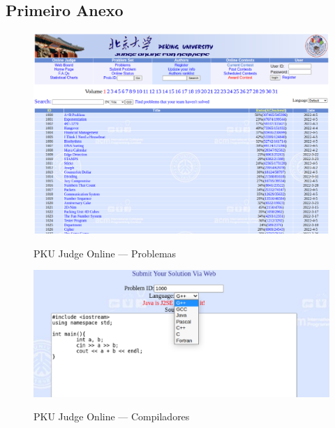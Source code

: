 \begin{anexosenv}

\partanexos
    
\chapter{Primeiro Anexo}

\begin{figure}[H]
    \centering
    \caption{PKU Judge Online — Problemas}
    \includegraphics[keepaspectratio=true,scale=0.35]{figuras/pku.eps}
    \label{fig:pku}
\end{figure}

\begin{figure}[H]
    \centering
    \caption{PKU Judge Online — Compiladores}
    \includegraphics[keepaspectratio=true,scale=0.4]{figuras/pku_2.eps}
    \label{fig:pku_2}
\end{figure}

\end{anexosenv}

